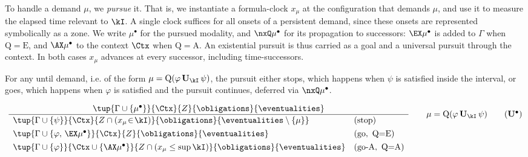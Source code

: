 To handle a demand $\mu$, we \emph{pursue} it. That is, we instantiate a formula-clock $x_\mu$ at the configuration that demands $\mu$, and use it to measure the elapsed time relevant to $\kI$. A single clock suffices for all onsets of a persistent demand, since these onsets are represented symbolically as a zone. We write $\mu^\bullet$ for the pursued modality, and $\nxQ\mu^\bullet$ for its propagation to successors: $\EX\mu^\bullet$ is added to $\Gamma$ when $\mathrm{Q}=\mathrm{E}$, and $\AX\mu^\bullet$ to the context $\Ctx$ when $\mathrm{Q}=\mathrm{A}$. An existential pursuit is thus carried as a goal and a universal pursuit through the context. In both cases $x_\mu$ advances at every successor, including time-successors.




For any until demand, i.e. of the form $\mu=\mathrm{Q}(\varphi\,\mathbf{U}_\kI\,\psi)$, the pursuit either {stops}, which happens when $\psi$ is satisfied inside the interval, or {goes}, which happens when $\varphi$ is satisfied and the pursuit continues, deferred via $\nxQ\mu^\bullet$.


\[
\frac{\tup{\Gamma\cup\{\mu^\bullet\}}{\Ctx}{Z}{\obligations}{\eventualities}}
{\begin{array}{ll}
\tup{\Gamma\cup\{\psi\}}{\Ctx}{Z\cap(x_\mu\!\in\!\kI)}{\obligations}{\eventualities\setminus\{\mu\}} & (\text{stop})\\[4pt]
\tup{\Gamma\cup\{\varphi,\,\EX\mu^\bullet\}}{\Ctx}{Z}{\obligations}{\eventualities} & (\text{go},\ \mathrm{Q}{=}\mathrm{E})\\[4pt]
\tup{\Gamma\cup\{\varphi\}}{\Ctx\cup\{\AX\mu^\bullet\}}{Z\cap(x_\mu\le\sup\kI)}{\obligations}{\eventualities} & (\text{go-A},\ \mathrm{Q}{=}\mathrm{A})
\end{array}}
\qquad \mu=\mathrm{Q}(\varphi\,\mathbf{U}_\kI\,\psi)
\tag{$\mathbf{U}^\bullet$}\label{tag:Uunf}
\]

